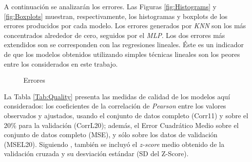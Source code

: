     \par A continuación se analizarán los errores. Las Figuras \ref{fig:Histograms}
    y \ref{fig:Boxplots} muestran, respectivamente, los histogramas y boxplots
    de los errores producidos por cada modelo. Los errores generados por
    \textit{KNN} son los más concentrados alrededor de cero, seguidos por el
    \textit{MLP}. Los dos errores más extendidos son se corresponden con
    las regresiones lineales. Éste es un indicador de que los modelos
    obtenidos utilizando simples técnicas lineales son los peores entre los
    considerados en este trabajo.
      \begin{figure}
      \centering
      \caption{Errores}\label{fig:Residuals}
      \end{figure}


  \par La Tabla \ref{Tab:Quality} presenta las medidas de calidad de los modelos
  aquí considerados: los coeficientes de la correlación de \textit{Pearson}\cite{pearson}
  entre los valores observados y ajustados, usando el conjunto de datos
  completo (Corr11) y sobre el 20\% para la validación (CorrL20); además,
  el Error Cuadrático Medio sobre el conjunto de datos completo (MSE), y
  sólo sobre los datos de validación (MSEL20). Siguiendo \cite{dynamics_of_dengue},
  también se incluyó el \textit{z-score} medio obtenido de la validación
  cruzada y su desviación estándar (SD del Z-Score).


